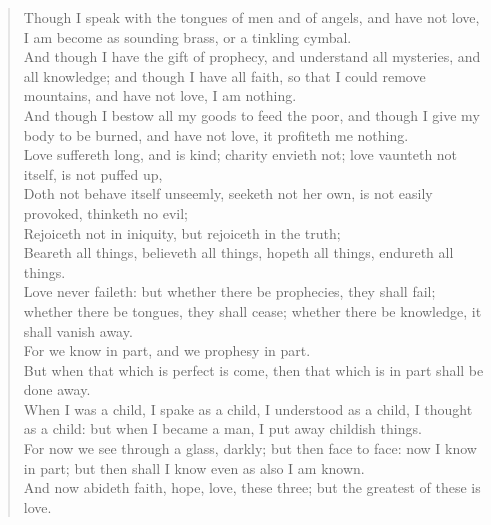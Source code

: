 \documentclass[MAIN]{subfiles}
\begin{document}
\begin{verse}
Though I speak with the tongues of men and of angels, and have not love, I am become as sounding brass, or a tinkling cymbal.\\
And though I have the gift of prophecy, and understand all mysteries, and all knowledge; and though I have all faith, so that I could remove mountains, and have not love, I am nothing.\\
And though I bestow all my goods to feed the poor, and though I give my body to be burned, and have not love, it profiteth me nothing.\\
Love suffereth long, and is kind; charity envieth not; love vaunteth not itself, is not puffed up,\\
Doth not behave itself unseemly, seeketh not her own, is not easily provoked, thinketh no evil;\\
Rejoiceth not in iniquity, but rejoiceth in the truth;\\
Beareth all things, believeth all things, hopeth all things, endureth all things.\\
Love never faileth: but whether there be prophecies, they shall fail; whether there be tongues, they shall cease; whether there be knowledge, it shall vanish away.\\
For we know in part, and we prophesy in part.\\
But when that which is perfect is come, then that which is in part shall be done away.\\
When I was a child, I spake as a child, I understood as a child, I thought as a child: but when I became a man, I put away childish things.\\
For now we see through a glass, darkly; but then face to face: now I know in part; but then shall I know even as also I am known.\\
And now abideth faith, hope, love, these three; but the greatest of these is love.
\end{verse}
\end{document}
